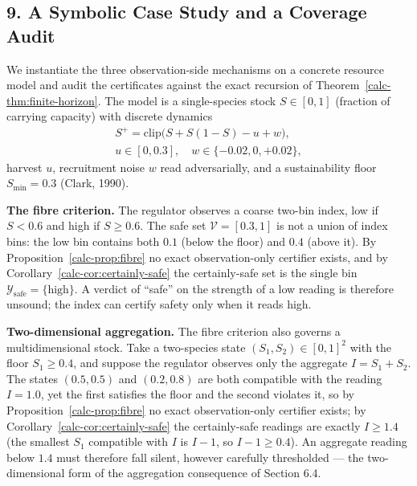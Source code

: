 \documentclass[10pt,twocolumn]{article}
\theoremstyle{definition}
\begin{document}
\subsection{9. A Symbolic Case Study and a Coverage Audit}\label{calc-case-study}

We instantiate the three observation-side mechanisms on a concrete resource model and audit the certificates against the exact recursion of Theorem~\ref{calc-thm:finite-horizon}. The model is a single-species stock \(S \in [0,1]\) (fraction of carrying capacity) with discrete dynamics
\[
\begin{gathered}
S^{+} = \mathrm{clip}\bigl(S + S(1-S) - u + w\bigr),\\
u \in [0, 0.3],\quad w \in \{-0.02, 0, +0.02\},
\end{gathered}
\]
harvest \(u\), recruitment noise \(w\) read adversarially, and a sustainability floor \(S_{\min} = 0.3\) (Clark, 1990).

\textbf{The fibre criterion.} The regulator observes a coarse two-bin index, low if \(S < 0.6\) and high if \(S \ge 0.6\). The safe set \(\mathcal{V} = [0.3, 1]\) is not a union of index bins: the low bin contains both \(0.1\) (below the floor) and \(0.4\) (above it). By Proposition~\ref{calc-prop:fibre} no exact observation-only certifier exists, and by Corollary~\ref{calc-cor:certainly-safe} the certainly-safe set is the single bin \(\mathcal{Y}_{\mathrm{safe}} = \{\text{high}\}\). A verdict of ``safe'' on the strength of a low reading is therefore unsound; the index can certify safety only when it reads high.

\textbf{Two-dimensional aggregation.} The fibre criterion also governs a multidimensional stock. Take a two-species state \((S_{1}, S_{2}) \in [0,1]^{2}\) with the floor \(S_{1} \ge 0.4\), and suppose the regulator observes only the aggregate \(I = S_{1} + S_{2}\). The states \((0.5, 0.5)\) and \((0.2, 0.8)\) are both compatible with the reading \(I = 1.0\), yet the first satisfies the floor and the second violates it, so by Proposition~\ref{calc-prop:fibre} no exact observation-only certifier exists; by Corollary~\ref{calc-cor:certainly-safe} the certainly-safe readings are exactly \(I \ge 1.4\) (the smallest \(S_{1}\) compatible with \(I\) is \(I - 1\), so \(I - 1 \ge 0.4\)). An aggregate reading below \(1.4\) must therefore fall silent, however carefully thresholded --- the two-dimensional form of the aggregation consequence of Section 6.4.
\end{document}
